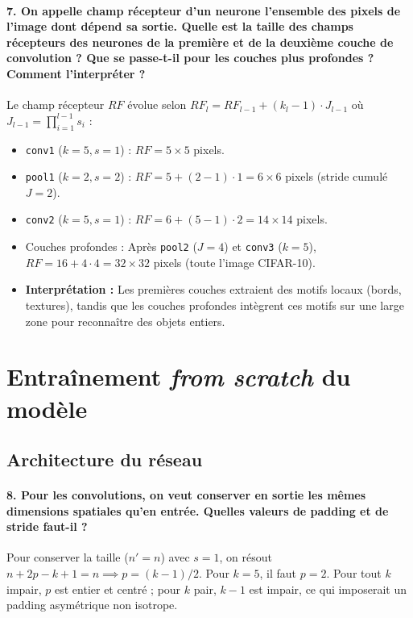 \documentclass{report}
\begin{document}
\paragraph{7. On appelle champ récepteur d'un neurone l'ensemble des pixels de l'image dont dépend sa sortie. Quelle est la taille des champs récepteurs des neurones de la première et de la deuxième couche de convolution ? Que se passe-t-il pour les couches plus profondes ? Comment l'interpréter ?}
 Le champ récepteur $RF$ évolue selon $RF_l = RF_{l-1} + (k_l - 1) \cdot J_{l-1}$ où $J_{l-1} = \prod_{i=1}^{l-1} s_i$ :
\begin{itemize}
    \item \texttt{conv1} ($k=5, s=1$) : $RF = 5 \times 5$ pixels.
    \item \texttt{pool1} ($k=2, s=2$) : $RF = 5 + (2-1) \cdot 1 = 6 \times 6$ pixels (stride cumulé $J=2$).
    \item \texttt{conv2} ($k=5, s=1$) : $RF = 6 + (5-1) \cdot 2 = 14 \times 14$ pixels.
    \item Couches profondes : Après \texttt{pool2} ($J=4$) et \texttt{conv3} ($k=5$), $RF = 16 + 4 \cdot 4 = 32 \times 32$ pixels (toute l'image CIFAR-10).
    \item \textbf{Interprétation :} Les premières couches extraient des motifs locaux (bords, textures), tandis que les couches profondes intègrent ces motifs sur une large zone pour reconnaître des objets entiers.
\end{itemize}

\section{Entraînement \textit{from scratch} du modèle}
\subsection{Architecture du réseau}

\paragraph{8. Pour les convolutions, on veut conserver en sortie les mêmes dimensions spatiales qu'en entrée. Quelles valeurs de padding et de stride faut-il ?}
 Pour conserver la taille ($n' = n$) avec $s=1$, on résout $n + 2p - k + 1 = n \implies p = (k-1)/2$. Pour $k=5$, il faut $p=2$. Pour tout $k$ impair, $p$ est entier et centré ; pour $k$ pair, $k-1$ est impair, ce qui imposerait un padding asymétrique non isotrope.
\end{document}
